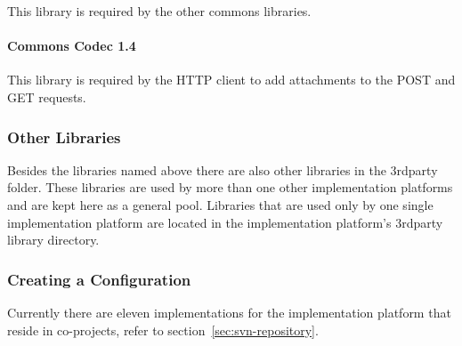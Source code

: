 \documentclass[11pt,a4paper]{article}
\begin{document}
This library is required by the other commons libraries.

\paragraph{Commons Codec 1.4}
\label{sec:commons-codec}

This library is required by the HTTP client to add attachments to the POST and
GET requests.


\subsubsection{Other Libraries}

Besides the libraries named above there are also other libraries in the
3rdparty folder. These libraries are used by more than one other implementation
platforms and are kept here as a general pool. Libraries that are used only by
one single implementation platform are located in the implementation platform's
3rdparty library directory.


\subsubsection{Creating a Configuration}
\label{sec:create-configuration}

Currently there are eleven implementations for the implementation platform
that reside in co-projects, refer to section~\ref{sec:svn-repository}.
\end{document}
